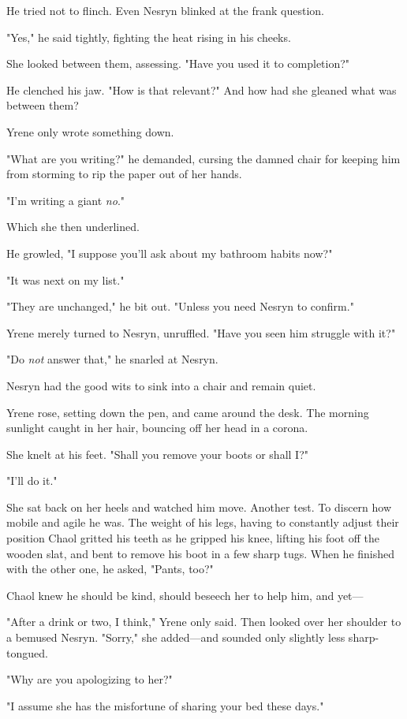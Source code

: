 He tried not to flinch. Even Nesryn blinked at the frank question.

"Yes," he said tightly, fighting the heat rising in his cheeks.

She looked between them, assessing. "Have you used it to completion?"

He clenched his jaw. "How is that relevant?" And how had she gleaned what was between them?

Yrene only wrote something down.

"What are you writing?" he demanded, cursing the damned chair for keeping him from storming to rip the paper out of her hands.

"I'm writing a giant \emph{no}."

Which she then underlined.

He growled, "I suppose you'll ask about my bathroom habits now?"

"It was next on my list."

"They are unchanged," he bit out. "Unless you need Nesryn to confirm."

Yrene merely turned to Nesryn, unruffled. "Have you seen him struggle with it?"

"Do \emph{not} answer that," he snarled at Nesryn.

Nesryn had the good wits to sink into a chair and remain quiet.

Yrene rose, setting down the pen, and came around the desk. The morning sunlight caught in her hair, bouncing off her head in a corona.

She knelt at his feet. "Shall you remove your boots or shall I?"

"I'll do it."

She sat back on her heels and watched him move. Another test. To discern how mobile and agile he was. The weight of his legs, having to constantly adjust their position  Chaol gritted his teeth as he gripped his knee, lifting his foot off the wooden slat, and bent to remove his boot in a few sharp tugs. When he finished with the other one, he asked, "Pants, too?"

Chaol knew he should be kind, should beseech her to help him, and yet---

"After a drink or two, I think," Yrene only said. Then looked over her shoulder to a bemused Nesryn. "Sorry," she added---and sounded only slightly less sharp-tongued.

"Why are you apologizing to her?"

"I assume she has the misfortune of sharing your bed these days."

